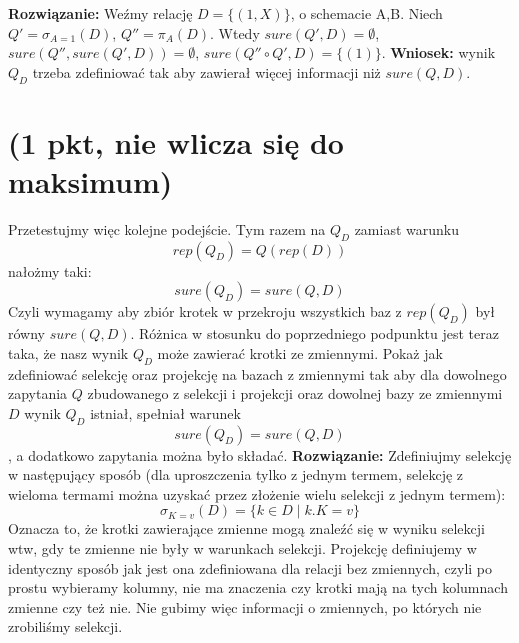 \documentclass{article}
\begin{document}
\textbf{Rozwiązanie:}
Weźmy relację $D = \{ (1,X) \}$, o schemacie A,B.
Niech $Q' = \sigma_{A=1}(D)$, $Q'' = \pi_{A}(D)$.
Wtedy $sure(Q', D) = \emptyset$, $sure(Q'', sure(Q', D)) = \emptyset$, $sure(Q'' \circ Q', D) = \{ (1) \}$.
\newline \textbf{Wniosek:} wynik $Q_D$ trzeba zdefiniować tak aby zawierał więcej informacji niż $sure(Q, D)$.

\section{(1 pkt, nie wlicza się do maksimum)}
Przetestujmy więc kolejne podejście. Tym razem na $Q_D$ zamiast warunku
\[
        rep(Q_D) = Q(rep(D))
\]
nałożmy taki:
\[
        sure(Q_D) = sure(Q, D)
\]
Czyli wymagamy aby zbiór krotek w przekroju wszystkich baz z $rep(Q_D)$ był równy $sure(Q, D)$. Różnica w stosunku do poprzedniego podpunktu jest teraz taka, że nasz wynik $Q_D$ może zawierać krotki ze zmiennymi. Pokaż jak zdefiniować selekcję oraz projekcję na bazach z zmiennymi tak aby dla dowolnego zapytania $Q$ zbudowanego z selekcji i projekcji oraz dowolnej bazy ze zmiennymi $D$ wynik $Q_D$ istniał, spełniał warunek
\[
        sure(Q_D) = sure(Q, D)
\]
, a dodatkowo zapytania można było składać.
\newline \textbf{Rozwiązanie:}
Zdefiniujmy selekcję w następujący sposób (dla uproszczenia tylko z jednym termem, selekcję z wieloma termami można uzyskać przez złożenie wielu selekcji z jednym termem):
\[
        \sigma_{K=v}(D) = \{ k \in D \mid k.K=v \}
\]
Oznacza to, że krotki zawierające zmienne mogą znaleźć się w wyniku selekcji wtw, gdy te zmienne nie były w warunkach selekcji.
Projekcję definiujemy w identyczny sposób jak jest ona zdefiniowana dla relacji bez zmiennych, czyli po prostu wybieramy kolumny, nie ma znaczenia czy krotki mają na tych kolumnach zmienne czy też nie.
\newline
Nie gubimy więc informacji o zmiennych, po których nie zrobiliśmy selekcji.
\end{document}
